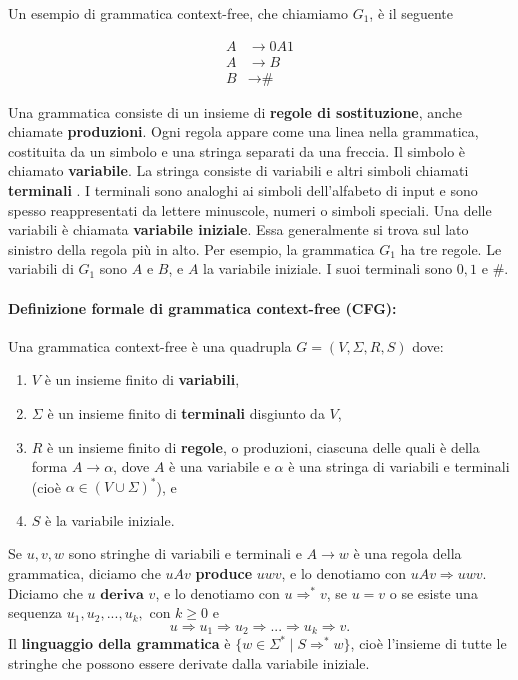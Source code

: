 \documentclass{article}
\begin{document}
Un esempio di grammatica context-free, che chiamiamo $G_1$, è il seguente

\begin{align*}
    A &\rightarrow 0A1 \\
    A &\rightarrow B \\
    B &\rightarrow \text{\#}
\end{align*}

Una grammatica consiste di un insieme di \textbf{regole di sostituzione}, anche chiamate \textbf{produzioni}. Ogni regola appare come una linea nella grammatica, costituita da un simbolo e una stringa separati da una freccia. Il simbolo è chiamato \textbf{variabile}. La stringa consiste di variabili e altri simboli chiamati \textbf{terminali}
. I terminali sono analoghi ai simboli dell'alfabeto di input e sono spesso reappresentati da lettere minuscole, numeri o simboli speciali. Una delle variabili è chiamata \textbf{variabile iniziale}. Essa generalmente si trova sul lato sinistro della regola più in alto.
Per esempio, la grammatica $G_1$ ha tre regole. Le variabili di $G_1$ sono $A$ e $B$, e $A$ la variabile iniziale. I suoi terminali sono $0,1$ e $\#$.
\vspace{2em}

\paragraph{Definizione formale di grammatica context-free (CFG):}
\text{  }

\begin{tcolorbox}[colback=yellow!10!white, colframe=yellow!50!black, title=Definizione 2.2]
    Una grammatica context-free è una quadrupla $G = (V,\Sigma,R,S)$ dove:
    \begin{enumerate}
        \item $V$ è un insieme finito di \textbf{variabili},
        \item $\Sigma$ è un insieme finito di \textbf{terminali} disgiunto da $V$,
        \item $R$ è un insieme finito di \textbf{regole}, o produzioni, ciascuna delle quali è della forma $A \rightarrow \alpha$, dove $A$ è una variabile e $\alpha$ è una stringa di variabili e terminali (cioè $\alpha \in (V \cup \Sigma)^{*}$), e
        \item $S$ è la variabile iniziale.
    \end{enumerate}
\end{tcolorbox}

Se $u,v,w$ sono stringhe di variabili e terminali e $A \rightarrow w$ è una regola della grammatica, diciamo che $uAv$ \textbf{produce} $uwv$, e lo denotiamo con $uAv \Rightarrow uwv$. Diciamo che $u \textbf{ deriva } v$, e lo denotiamo con $u \Rightarrow^* v$, se $u = v$ o se esiste una sequenza $u_1,u_2,...,u_k, \text{ con } k \geq 0$ e 
$$
u \Rightarrow u_1 \Rightarrow u_2 \Rightarrow ... \Rightarrow u_k \Rightarrow v.
$$
Il \textbf{linguaggio della grammatica} è $\{w \in \Sigma^{*} \mid S \Rightarrow^* w\}$, cioè l'insieme di tutte le stringhe che possono essere derivate dalla variabile iniziale.
\end{document}
